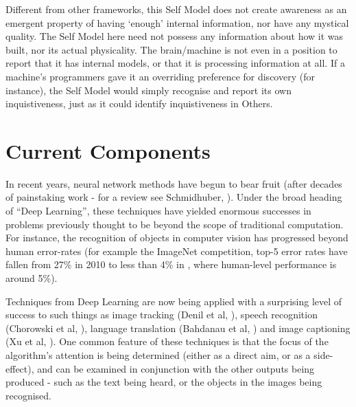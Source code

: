 \documentclass[citeauthoryear]{llncs}
\begin{document}
Different from other frameworks, this Self Model does not create awareness as an emergent property of 
having `enough' internal information, nor have any mystical quality.  
%
The Self Model here need not possess any information about how it was built, 
nor its actual physicality.  
%
The brain/machine is not even in a position to report that it has internal models, 
or that it is processing information at all.
%
If a machine's programmers gave it an overriding preference for discovery (for instance),
the Self Model would simply recognise and report its own inquistiveness, just as it 
could identify inquistiveness in Others.

%




\section{Current Components}

In recent years, neural network methods have begun to bear fruit (after decades
of painstaking work - for a review see Schmidhuber, \cite{SchmidhuberOverview}).
%
Under the broad heading of ``Deep Learning'', these techniques have yielded 
enormous successes in problems previously thought to be beyond the scope of traditional computation.
%
For instance, the recognition of objects in computer vision 
has progressed beyond human error-rates (for example the ImageNet competition, top-5 error rates
have fallen from 27\% in 2010 to less than 4\% in \cite{MSRresnet}, where human-level performance is around 5\%).

Techniques from Deep Learning are now being applied with a surprising 
level of success to such things as 
image tracking (Denil et al, \cite{VisualAttention}), 
speech recognition (Chorowski et al, \cite{SpeechAttention}), 
language translation (Bahdanau et al, \cite{TranslationAttention}) 
and image captioning (Xu et al, \cite{ImageCaptioning}).
%
One common feature of these techniques is that
the focus of the algorithm's attention is being determined 
(either as a direct aim, or as a side-effect), 
and can be examined in conjunction with the other outputs being produced - 
such as the text being heard, or the objects in the images being recognised.
\end{document}
